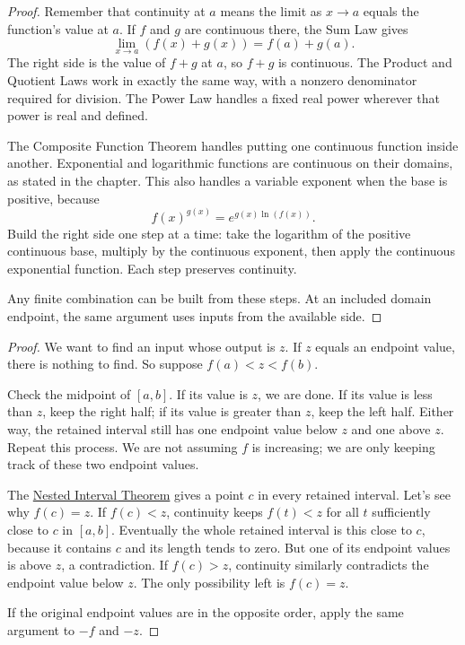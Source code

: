 
\begin{proof}
Remember that continuity at $a$ means the limit as $x\to a$ equals the
function's value at $a$. If $f$ and $g$ are continuous there, the Sum
Law gives
$$\lim_{x\to a}(f(x)+g(x))=f(a)+g(a).$$
The right side is the value of $f+g$ at $a$, so $f+g$ is continuous.
The Product and Quotient Laws work in exactly the same way, with a
nonzero denominator required for division. The Power Law handles a
fixed real power wherever that power is real and defined.

The Composite Function Theorem handles putting one continuous function
inside another. Exponential and logarithmic functions are continuous
on their domains, as stated in the chapter. This also handles a variable
exponent when the base is positive, because
$$f(x)^{g(x)}=e^{g(x)\ln(f(x))}.$$
Build the right side one step at a time: take the logarithm of the
positive continuous base, multiply by the continuous exponent, then
apply the continuous exponential function. Each step preserves continuity.

Any finite combination can be built from these steps. At an included
domain endpoint, the same argument uses inputs from the available side.
\end{proof}


\begin{proof}
We want to find an input whose output is $z$. If $z$ equals an endpoint
value, there is nothing to find. So suppose $f(a)<z<f(b)$.

Check the midpoint of $[a,b]$. If its value is $z$, we are done.
If its value is less than $z$, keep the right half; if its value is
greater than $z$, keep the left half. Either way, the retained
interval still has one endpoint value below $z$ and one above $z$.
Repeat this process. We are not assuming $f$ is increasing; we are only
keeping track of these two endpoint values.

The \hyperref[sec:nested-interval-theorem]{Nested Interval Theorem}
gives a point $c$ in every retained interval. Let's see why $f(c)=z$.
If $f(c)<z$, continuity keeps $f(t)<z$ for all $t$ sufficiently close
to $c$ in $[a,b]$. Eventually the whole retained interval is this close
to $c$, because it contains $c$ and its length tends to zero.
But one of its endpoint values is above $z$, a contradiction.
If $f(c)>z$, continuity similarly contradicts the endpoint value below $z$.
The only possibility left is $f(c)=z$.

If the original endpoint values are in the opposite order, apply the
same argument to $-f$ and $-z$.
\end{proof}

